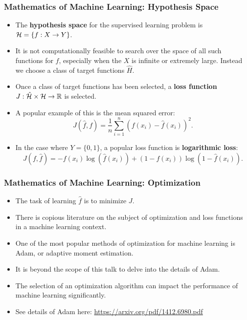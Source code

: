 		\begin{frame}
		\frametitle{Mathematics of Machine Learning: Hypothesis Space}
		\begin{itemize}
			\item The \textbf{hypothesis space} for the supervised learning problem is $\mathcal{H} = \{f:X\rightarrow Y\}$.
			\medskip
			\item It is not computationally feasible to search over the space
			of all such functions for $f$, especially when the $X$ is infinite or extremely large. Instead we choose a class of target functions $\hat{H}$.
			\medskip
			\item Once a class of target functions has been selected, a \textbf{loss function} $J:\hat{\mathcal{H}}\times \mathcal{H}\rightarrow \mathbb{R}$ is selected.
			\medskip
			\item A popular example of this is the mean squared error:
				$$J(\hat{f},f) = \frac{1}{n} \sum_{i=1}^n (f(x_i)-\hat{f}(x_i))^2.$$
			\item In the case where $Y=\{0,1\}$, a popular loss function is \textbf{logarithmic loss}:
				$$J(f,\hat{f}) = -f(x_i)\log(\hat{f}(x_i))+(1-f(x_i))\log(1-\hat{f}(x_i)).$$
		\end{itemize}
		\end{frame}

		\begin{frame}
		\frametitle{Mathematics of Machine Learning: Optimization}
		
			\begin{itemize}
			\item The task of learning $\hat{f}$ is to minimize $J$.
			\item There is copious literature on the subject of optimization and loss functions in a machine learning context.
			\item One of the most popular methods of optimization for machine learning is Adam, or adaptive moment estimation.
			\item It is beyond the scope of this talk to delve into the details of Adam.
			\item The selection of an optimization algorithm can impact the performance of machine learning significantly. 
			\item See details of Adam here: \url{https://arxiv.org/pdf/1412.6980.pdf}
			\end{itemize}
		\end{frame}
		
